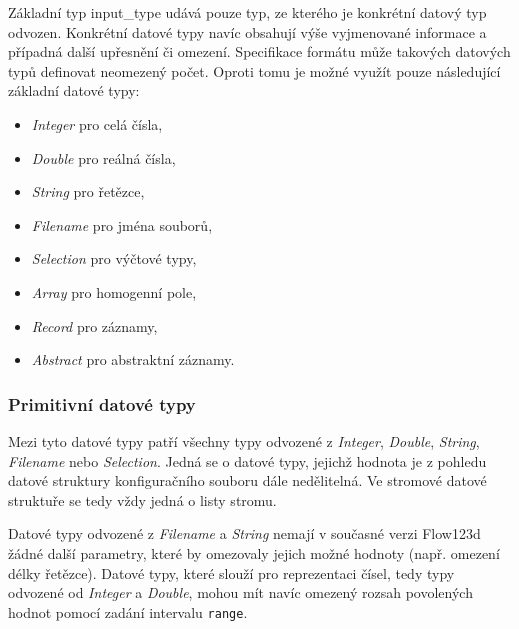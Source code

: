 \documentclass[FM,bw,DP]{tulthesis}
\begin{document}
Základní typ input\_type udává pouze typ, ze kterého je konkrétní datový typ odvozen. Konkrétní datové typy navíc obsahují výše vyjmenované informace a případná další upřesnění či omezení. Specifikace formátu může takových datových typů definovat neomezený počet. Oproti tomu je možné využít pouze následující základní datové typy:

\begin{itemize}
\item \textit{Integer} pro celá čísla,
\item \textit{Double} pro reálná čísla,
\item \textit{String} pro řetězce,
\item \textit{Filename} pro jména souborů,
\item \textit{Selection} pro výčtové typy,
\item \textit{Array} pro homogenní pole,
\item \textit{Record} pro záznamy,
\item \textit{Abstract} pro abstraktní záznamy.
\end{itemize}



\subsubsection{Primitivní datové typy}

Mezi tyto datové typy patří všechny typy odvozené z \textit{Integer}, \textit{Double}, \textit{String}, \textit{Filename} nebo \textit{Selection}. Jedná se o datové typy, jejichž hodnota je z pohledu datové struktury konfiguračního souboru dále nedělitelná. Ve stromové datové struktuře se tedy vždy jedná o listy stromu.

Datové typy odvozené z \textit{Filename} a \textit{String} nemají v současné verzi Flow123d žádné další parametry, které by omezovaly jejich možné hodnoty (např. omezení délky řetězce). Datové typy, které slouží pro reprezentaci čísel, tedy typy odvozené od \textit{Integer} a \textit{Double}, mohou mít navíc omezený rozsah povolených hodnot pomocí zadání intervalu \texttt{range}.
\end{document}
